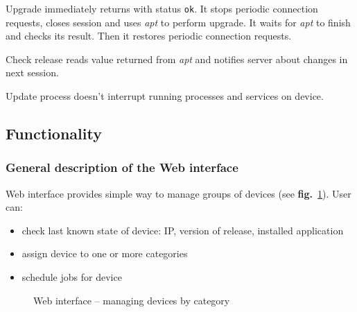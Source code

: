 Upgrade immediately returns with status \verb|ok|. It stops periodic connection requests, closes session and uses \emph{apt} to perform upgrade. It waits for \emph{apt} to finish and checks its result. Then it restores periodic connection requests.

Check release reads value returned from \emph{apt} and notifies server about changes in next session.

Update process doesn't interrupt running processes and services on device. 

\subsection{Functionality}

\subsubsection{General description of the Web interface}

Web interface provides simple way to manage groups of devices (see \textbf{fig.}~\ref{fig:gui}). User can:
\begin{itemize}
  \item check last known state of device: IP, version of release, installed application
  \item assign device to one or more categories
  \item schedule jobs for device
\end{itemize}

\begin{figure}[htbp]
  \centering
    \caption{Web interface -- managing devices by category}
    \label{fig:gui}
\end{figure}

